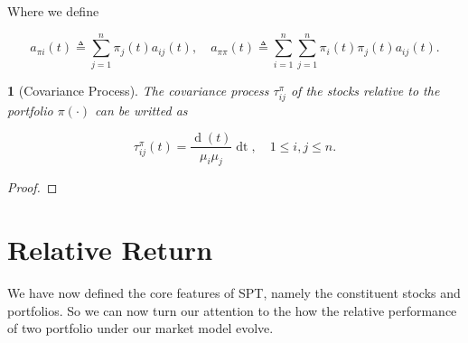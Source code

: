 \documentclass[british]{amsart} \usepackage{lmodern}
\numberwithin{equation}{section} \numberwithin{figure}{section}
\theoremstyle{plain} \newtheorem{thm}{\protect\theoremname}[section]
\theoremstyle{definition} \newtheorem{defn}[thm]{\protect\definitionname}
\theoremstyle{plain} \newtheorem{assumption}[thm]{\protect\assumptionname}
\theoremstyle{plain} \newtheorem{lem}[thm]{\protect\lemmaname}
\theoremstyle{plain} \newtheorem{prop}[thm]{\protect\propositionname}
\theoremstyle{remark} \newtheorem{rem}[thm]{\protect\remarkname}
\theoremstyle{plain} \newtheorem{cor}[thm]{\protect\corollaryname}
\renewcommand{\d}[1]{\mathop{\mathrm{d}{#1}}}
\newcommand{\defeq}{\mathop{\triangleq}} \newcommand{\almostsurely}{\text{a.s.}}
\begin{document}
Where we define

  \begin{equation}
      a_{\pi i}(t) \defeq \sum_{j=1}^{n} \pi_{j}(t)a_{ij}(t), \quad 
      a_{\pi \pi}(t) \defeq \sum_{i=1}^{n} \sum_{j=1}^{n} \pi_{i}(t) \pi_{j}(t) a_{ij}(t).
  \end{equation}


\begin{lem} [Covariance Process]

The covariance process $\tau_{ij}^{\pi}$ of the stocks relative to the portfolio $\pi(\cdot)$ 
can be writted as

\begin{equation}
  \label{eq:tau}
  \tau_{ij}^{\pi}(t) = 
    \frac{ \d{\langle \mu_{i}, \mu_{j} \rangle}(t)}{ \mu_{i} \mu_{j}}\d{t},
    \quad 1 \le i,j \le n.
\end{equation}

\end{lem}

\begin{proof}
\end{proof}

\newpage
\section{Relative Return}

We have now defined the core features of SPT, namely the constituent stocks and
portfolios. So we can now turn our attention to the how the relative performance of
two portfolio under our market model evolve.
\end{document}
